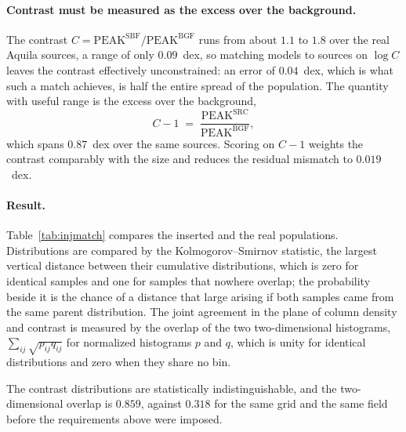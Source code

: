 \documentclass[11pt,a4paper]{article}
\begin{document}
\paragraph{Contrast must be measured as the excess over the background.}
The contrast $C = \mathrm{PEAK^{SBF}}/\mathrm{PEAK^{BGF}}$ runs from about
$1.1$ to $1.8$ over the real Aquila sources, a range of only $0.09$~dex, so
matching models to sources on $\log C$ leaves the contrast effectively
unconstrained: an error of $0.04$~dex, which is what such a match achieves, is
half the entire spread of the population. The quantity with useful range is
the excess over the background,
\begin{equation}
  C - 1 \;=\; \frac{\mathrm{PEAK^{SRC}}}{\mathrm{PEAK^{BGF}}},
\end{equation}
which spans $0.87$~dex over the same sources. Scoring on $C-1$ weights the
contrast comparably with the size and reduces the residual mismatch to
$0.019$~dex.

\paragraph{Result.}
Table~\ref{tab:injmatch} compares the inserted and the real populations.
Distributions are compared by the Kolmogorov--Smirnov statistic, the largest
vertical distance between their cumulative distributions, which is zero for
identical samples and one for samples that nowhere overlap; the probability
beside it is the chance of a distance that large arising if both samples came
from the same parent distribution. The joint agreement in the plane of column
density and contrast is measured by the overlap of the two two-dimensional
histograms, $\sum_{ij}\sqrt{p_{ij}q_{ij}}$ for normalized histograms $p$ and
$q$, which is unity for identical distributions and zero when they share no
bin.

The contrast distributions are statistically indistinguishable, and the
two-dimensional overlap is $0.859$, against $0.318$ for the same grid and the
same field before the requirements above were imposed. 
\end{document}
